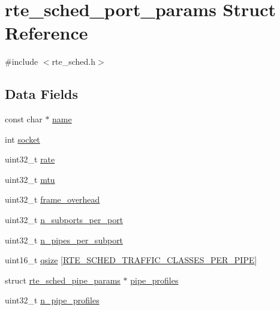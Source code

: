 \hypertarget{structrte__sched__port__params}{}\section{rte\+\_\+sched\+\_\+port\+\_\+params Struct Reference}
\label{structrte__sched__port__params}


{\ttfamily \#include $<$rte\+\_\+sched.\+h$>$}

\subsection*{Data Fields}
\begin{DoxyCompactItemize}
\item 
const char $\ast$ \hyperlink{structrte__sched__port__params_a8f8f80d37794cde9472343e4487ba3eb}{name}
\item 
int \hyperlink{structrte__sched__port__params_a3666576f6b88007cc7b8f26c7da596c8}{socket}
\item 
uint32\+\_\+t \hyperlink{structrte__sched__port__params_a82e0b1311e54c51fa587134c4f9bad50}{rate}
\item 
uint32\+\_\+t \hyperlink{structrte__sched__port__params_a3c8ee4e9dd2a5354e83fb30c95598f30}{mtu}
\item 
uint32\+\_\+t \hyperlink{structrte__sched__port__params_a0f2c854b2c7f05f1e31a929b9c070438}{frame\+\_\+overhead}
\item 
uint32\+\_\+t \hyperlink{structrte__sched__port__params_a5fc7f8b94ee9fb392269ab69deb56a67}{n\+\_\+subports\+\_\+per\+\_\+port}
\item 
uint32\+\_\+t \hyperlink{structrte__sched__port__params_ab560ed2b4d276da9403539787fd2ecad}{n\+\_\+pipes\+\_\+per\+\_\+subport}
\item 
uint16\+\_\+t \hyperlink{structrte__sched__port__params_a98277794202bfdf78db8bca71abaa98c}{qsize} \mbox{[}\hyperlink{rte__sched_8h_a987eaedb9cd05abdbdb1bf30ed446ac1}{R\+T\+E\+\_\+\+S\+C\+H\+E\+D\+\_\+\+T\+R\+A\+F\+F\+I\+C\+\_\+\+C\+L\+A\+S\+S\+E\+S\+\_\+\+P\+E\+R\+\_\+\+P\+I\+P\+E}\mbox{]}
\item 
struct \hyperlink{structrte__sched__pipe__params}{rte\+\_\+sched\+\_\+pipe\+\_\+params} $\ast$ \hyperlink{structrte__sched__port__params_a516d68d24b2f41e9737502fbf2097db5}{pipe\+\_\+profiles}
\item 
uint32\+\_\+t \hyperlink{structrte__sched__port__params_a2b738077966491798fdf273913b2f4b2}{n\+\_\+pipe\+\_\+profiles}
\end{DoxyCompactItemize}


